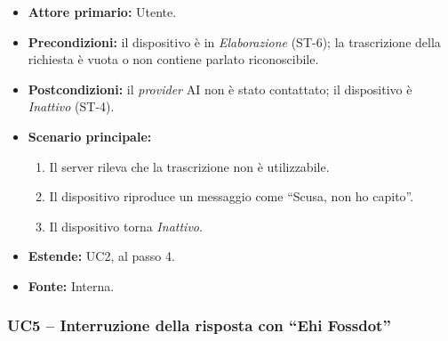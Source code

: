 \documentclass[12pt,a4paper]{article}
\newcommand{\tightlist}{\setlength{\itemsep}{1pt}\setlength{\parskip}{0pt}}
\begin{document}
\begin{itemize}

\tightlist

\item \textbf{Attore primario:} Utente.

\item \textbf{Precondizioni:} il dispositivo è in \emph{Elaborazione} (ST-6); la trascrizione della richiesta è vuota o non contiene parlato riconoscibile.

\item \textbf{Postcondizioni:} il \emph{provider} AI non è stato contattato; il dispositivo è \emph{Inattivo} (ST-4).

\item \textbf{Scenario principale:}

\begin{enumerate}

\tightlist

\item Il server rileva che la trascrizione non è utilizzabile.

\item Il dispositivo riproduce un messaggio come ``Scusa, non ho capito''.

\item Il dispositivo torna \emph{Inattivo}.

\end{enumerate}

\item \textbf{Estende:} UC2, al passo 4.

\item \textbf{Fonte:} Interna.

\end{itemize}



\subsubsection{UC5 -- Interruzione della risposta con ``Ehi Fossdot''}
\end{document}

